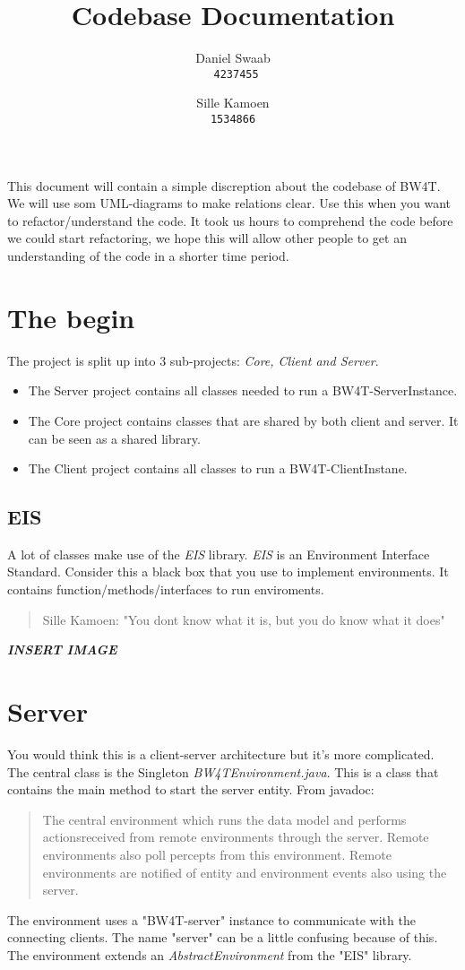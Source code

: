 \documentclass{article}
\begin{document}
\title{Codebase Documentation}
\author{Daniel Swaab\\
\texttt{ 4237455}
\and
Sille Kamoen \\
\texttt{1534866}
}
\maketitle

This document will contain a simple discreption about the codebase of BW4T. We will use som UML-diagrams to make relations clear. Use this when you want to refactor/understand the code. It took us hours to comprehend the code before we could start refactoring, we hope this will allow other people to get an understanding of the code in a shorter time period. 

\section*{The begin}
The project is split up into 3 sub-projects: \emph{Core, Client and Server}.
\begin{itemize}
	\item The Server project contains all classes needed to run a BW4T-ServerInstance.
	\item The Core project contains classes that are shared by both client and server. It can be seen as a shared library.
	\item The Client project contains all classes to run a BW4T-ClientInstane. 

\end{itemize}  
	
	\subsection*{EIS}
	A lot of classes make use of the \emph{EIS} library. \emph{EIS} is an Environment Interface Standard. Consider this a black box that you use to implement environments. It contains function/methods/interfaces to run enviroments. %
	\begin{quote}
		Sille Kamoen: "You dont know what it is, but you do know what it does" 
	\end{quote}
\textbf{\emph{INSERT IMAGE}}	 

\section*{Server} 
You would think this is a client-server architecture but it's more complicated. The central class is the Singleton \emph{BW4TEnvironment.java}. This is a class that contains the main method to start the server entity. From javadoc: 
\begin{quote}
The central environment which runs the data model and performs actionsreceived from remote environments through the server. Remote environments also poll percepts from this environment. Remote environments are notified of entity and environment events also using the server. 
\end{quote}  

The environment uses a "BW4T-server" instance to communicate with the connecting clients. The name "server" can be a little confusing because of this. 
The environment extends an \emph{AbstractEnvironment} from the "EIS" library.
\end{document}
